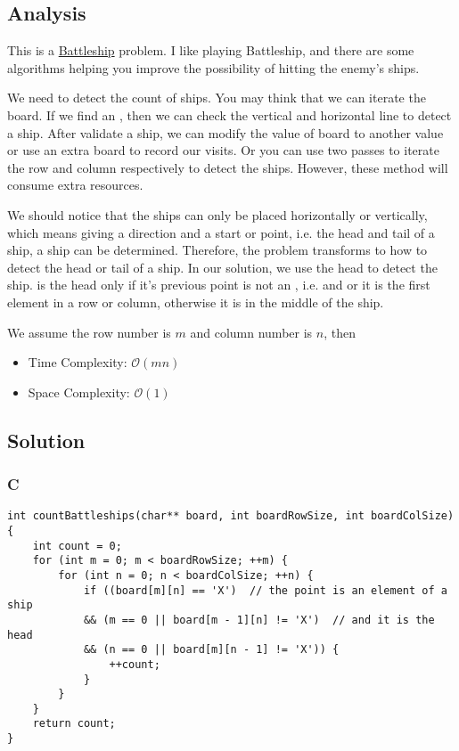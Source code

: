 \subsection*{Analysis}
This is a \href{https://en.wikipedia.org/wiki/Battleship_(game)}{Battleship} problem. I like playing Battleship, and there are some algorithms helping you improve the possibility of hitting the enemy's ships.

We need to detect the count of ships. You may think that we can iterate the board. If we find an , then we can check the vertical and horizontal line to detect a ship. After validate a ship, we can modify the value of board to another value or use an extra board to record our visits. Or you can use two passes to iterate the row and column respectively to detect the ships. However, these method will consume extra resources.

We should notice that the ships can only be placed horizontally or vertically, which means giving a direction and a start or point, i.e. the head and tail of a ship, a ship can be determined. Therefore, the problem transforms to how to detect the head or tail of a ship. In our solution, we use the head to detect the ship.  is the head only if it's previous point is not an , i.e.  and  or it is the first element in a row or column, otherwise it is in the middle of the ship.

We assume the row number is $m$ and column number is $n$, then
\begin{itemize}
    \item Time Complexity: $\mathcal{O}(mn)$
    \item Space Complexity: $\mathcal{O}(1)$
\end{itemize}

\subsection*{Solution}
\subsubsection*{C}
\begin{verbatim}
int countBattleships(char** board, int boardRowSize, int boardColSize) {
    int count = 0;
    for (int m = 0; m < boardRowSize; ++m) {
        for (int n = 0; n < boardColSize; ++n) {
            if ((board[m][n] == 'X')  // the point is an element of a ship
            && (m == 0 || board[m - 1][n] != 'X')  // and it is the head
            && (n == 0 || board[m][n - 1] != 'X')) {
                ++count;
            }
        }
    }
    return count;
}
\end{verbatim}

\newpage

